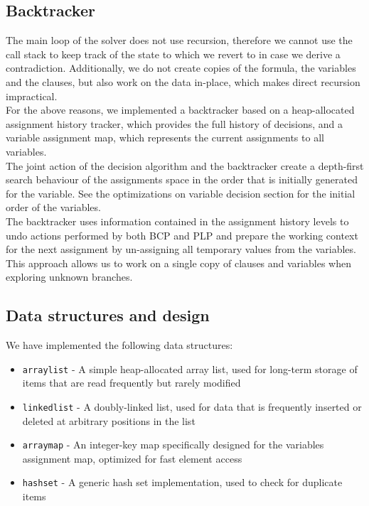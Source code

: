\documentclass[a4paper]{article}
\begin{document}
\subsection{Backtracker}

The main loop of the solver does not use recursion, therefore we cannot use the call stack to keep track of the state to which we revert to in case we derive a contradiction. Additionally, we do not create copies of the formula, the variables and the clauses, but also work on the data in-place, which makes direct recursion impractical.\\
For the above reasons, we implemented a backtracker based on a heap-allocated assignment history tracker, which provides the full history of decisions, and a variable assignment map, which represents the current assignments to all variables.\\
The joint action of the decision algorithm and the backtracker create a depth-first search behaviour of the assignments space in the order that is initially generated for the variable. See the optimizations on variable decision section for the initial order of the variables.\\
The backtracker uses information contained in the assignment history levels to undo actions performed by both BCP and PLP and prepare the working context for the next assignment by un-assigning all temporary values from the variables. This approach allows us to work on a single copy of clauses and variables when exploring unknown branches.\\

\subsection{Data structures and design}

We have implemented the following data structures:

\begin{itemize}

\item \texttt{arraylist} - A simple heap-allocated array list, used for long-term storage of items that are read frequently but rarely modified

\item \texttt{linkedlist} - A doubly-linked list, used for data that is frequently inserted or deleted at arbitrary positions in the list

\item \texttt{arraymap} - An integer-key map specifically designed for the variables assignment map, optimized for fast element access

\item \texttt{hashset} - A generic hash set implementation, used to check for duplicate items

\end{itemize}
\end{document}
